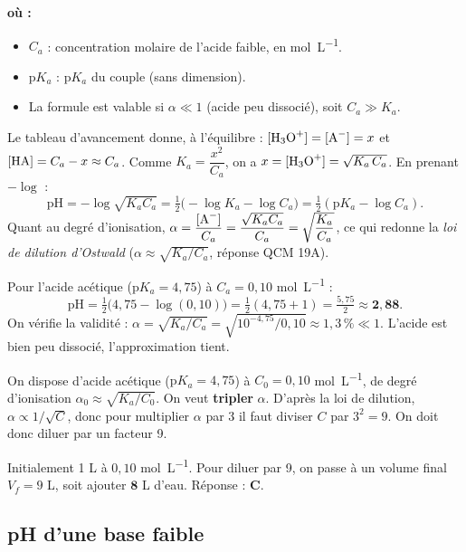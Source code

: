\documentclass[11pt,a4paper]{article}
\newenvironment{ou}{%
  \par\smallskip\noindent\textbf{où :}\nopagebreak
  \begin{itemize}[leftmargin=1.8em,topsep=2pt,itemsep=1.5pt,parsep=0pt]}%
  {\end{itemize}}
\begin{document}
\begin{ou}
\item $C_a$ : concentration molaire de l'acide faible, en \si{mol.L^{-1}}.
\item $\mathrm{p}K_a$ : $\mathrm{p}K_a$ du couple  (sans dimension).
\item La formule est valable si $\alpha \ll 1$ (acide peu dissocié), soit $C_a \gg K_a$.
\end{ou}

\begin{methode}[démonstration]
Le tableau d'avancement donne, à l'équilibre : $[\ce{H3O+}] = [\ce{A-}] = x$ et $[\ce{HA}] = C_a - x \approx C_a$.
Comme $K_a = \dfrac{x^2}{C_a}$, on a $x = [\ce{H3O+}] = \sqrt{K_a\,C_a}$. En prenant $-\log$ :
\[ \mathrm{pH} = -\log\sqrt{K_a C_a} = \tfrac{1}{2}\bigl(-\log K_a - \log C_a\bigr) = \tfrac{1}{2}(\mathrm{p}K_a - \log C_a). \]
Quant au degré d'ionisation, $\alpha = \dfrac{[\ce{A-}]}{C_a} = \dfrac{\sqrt{K_a C_a}}{C_a} = \sqrt{\dfrac{K_a}{C_a}}$,
ce qui redonne la \emph{loi de dilution d'Ostwald} ($\alpha \approx \sqrt{K_a/C_a}$, réponse QCM 19A).
\end{methode}

\begin{exemple}
Pour l'acide acétique ($\mathrm{p}K_a = 4{,}75$) à $C_a = 0{,}10$ \si{mol.L^{-1}} :
\[ \mathrm{pH} = \tfrac{1}{2}\bigl(4{,}75 - \log(0{,}10)\bigr) = \tfrac{1}{2}(4{,}75 + 1) = \tfrac{5{,}75}{2} \approx \mathbf{2{,}88}. \]
On vérifie la validité : $\alpha = \sqrt{K_a/C_a} = \sqrt{10^{-4{,}75}/0{,}10} \approx 1{,}3\,\% \ll 1$. L'acide est
bien peu dissocié, l'approximation tient.
\end{exemple}

\begin{exemple}
On dispose d'acide acétique ($\mathrm{p}K_a = 4{,}75$) à $C_0 = 0{,}10$ \si{mol.L^{-1}}, de degré
d'ionisation $\alpha_0 \approx \sqrt{K_a/C_0}$. On veut \textbf{tripler} $\alpha$. D'après la loi de
dilution, $\alpha \propto 1/\sqrt{C}$, donc pour multiplier $\alpha$ par 3 il faut diviser $C$ par $3^2 = 9$.
On doit donc diluer par un facteur 9.

\smallskip
Initialement 1 L à $0{,}10$ \si{mol.L^{-1}}. Pour diluer par 9, on passe à un volume final $V_f = 9$ L, soit
ajouter $\mathbf{8}$ \si{L} d'eau. Réponse : \textbf{C}.
\end{exemple}

\subsection{pH d'une base faible}
\end{document}
